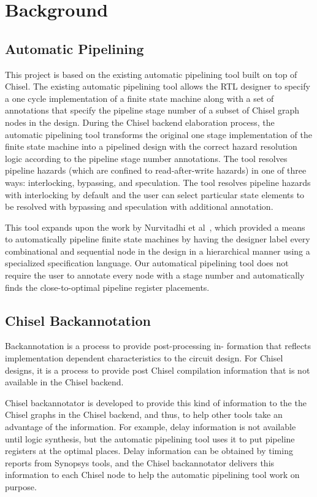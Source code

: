 \section{Background}
\subsection{Automatic Pipelining}
\label{sec:related-work}
This project is based on the existing automatic pipelining tool built on top of Chisel\cite{Bachrach:2012}. The existing automatic pipelining tool allows the RTL designer to specify a one cycle implementation of a finite state machine along with a set of annotations that specify the pipeline stage number of a subset of Chisel graph nodes in the design. During the Chisel backend elaboration process, the automatic pipelining tool transforms the original one stage implementation of the finite state machine into a pipelined design with the correct hazard resolution logic according to the pipeline stage number annotations. The tool resolves pipeline hazards (which are confined to read-after-write hazards) in one of three ways: interlocking, bypassing, and speculation. The tool resolves pipeline hazards with interlocking by default and the user can select particular state elements to be resolved with bypassing and speculation with additional annotation.

This tool expands upon the work by Nurvitadhi et al~\cite{hoe:syn}, which provided a means to automatically pipeline finite state machines by having the designer label every combinational and sequential node in the design in a hierarchical manner using a specialized specification language. Our automatical pipelining tool does not require the user to annotate every node with a stage number and automatically finds the close-to-optimal pipeline register placements.

\subsection{Chisel Backannotation}
Backannotation is a process to provide post-processing in- formation that reflects implementation dependent characteristics to the circuit design. For Chisel designs, it is a process to provide post Chisel compilation information that is not available in the Chisel backend.

Chisel backannotator is developed to provide this kind of information to the the Chisel graphs in the Chisel backend, and thus, to help other tools take an advantage of the information. For example, delay information is not available until logic synthesis, but the automatic pipelining tool uses it to put pipeline registers at the optimal places. Delay information can be obtained by timing reports from Synopsys tools, and the Chisel backannotator delivers this information to each Chisel node to help the automatic pipelining tool work on purpose.

